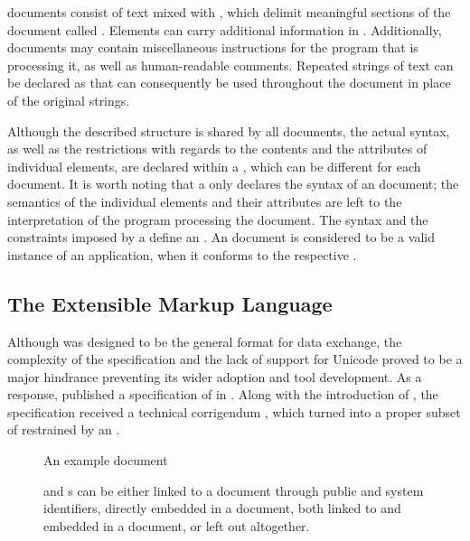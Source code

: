 \documentclass{book}
\begin{document}
 documents consist of text mixed with %
, which delimit meaningful sections of the document called
. Elements can carry additional
information in . Additionally,
 documents may contain miscellaneous instructions for the program
that is processing it, as well as human-readable comments. Repeated strings of
text can be declared as  
that can consequently be used throughout the document in place of the original
strings.

Although the described structure is shared by all  documents, the
actual syntax, as well as the restrictions with regards to the contents and the
attributes of individual elements, are declared within a , which
can be different for each document. It is worth noting that a  only
declares the syntax of an  document; the semantics of the
individual elements and their attributes are left to the interpretation of the
program processing the document. The syntax and the constraints imposed by a
 define an 
. An  document is considered to be a
valid instance of an  application, when it conforms to the
respective .

\subsection{The Extensible Markup Language}
Although  was designed to be the general format for data exchange,
the complexity of the specification and the lack of support for Unicode proved
to be a major hindrance preventing its wider adoption and tool development. As a
response,  published a specification of  in
\citeyear{bray98}. Along with the introduction of , the
 specification received a technical corrigendum
\cite{goldfarb97:webSGML}, which turned  into a proper subset of
 restrained by an  .

\begin{figure}
  \caption{An example  document}
  \label{fig:recipe}\bigskip
  \caption{ and  s can be either linked
    to a document through public and system identifiers, directly embedded in
    a document, both linked to and embedded in a document, or left out
    altogether.}
  \label{fig:recipe-dtd}
\end{figure}
        
\end{document}
